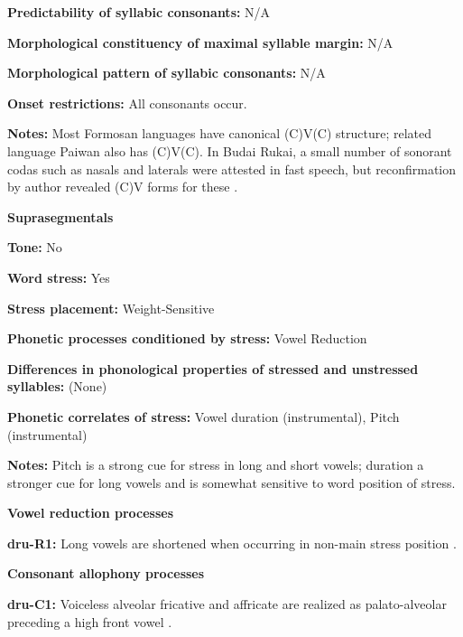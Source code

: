 \textbf{Predictability of syllabic consonants:} N/A



\textbf{Morphological constituency of maximal syllable margin:} N/A



\textbf{Morphological pattern of syllabic consonants:} N/A



\textbf{Onset restrictions:} All consonants occur.



\textbf{Notes:} Most Formosan languages have canonical (C)V(C) structure; related language Paiwan also has (C)V(C). In Budai Rukai, a small number of sonorant codas such as nasals and laterals were attested in fast speech, but reconfirmation by author revealed (C)V forms for these \citep[213]{Chen2006}.



\textbf{Suprasegmentals}



\textbf{Tone:} No



\textbf{Word stress:} Yes



\textbf{Stress placement:} Weight-Sensitive



\textbf{Phonetic processes conditioned by stress:} Vowel Reduction



\textbf{Differences in phonological properties of stressed and unstressed syllables:} (None)



\textbf{Phonetic correlates of stress:} Vowel duration (instrumental), Pitch (instrumental)



\textbf{Notes:} Pitch is a strong cue for stress in long and short vowels; duration a stronger cue for long vowels and is somewhat sensitive to word position of stress.



\textbf{Vowel reduction processes}



\textbf{dru-R1:} Long vowels are shortened when occurring in non-main stress position \citep[257]{Chen2006}.



\textbf{Consonant allophony processes}



\textbf{dru-C1:} Voiceless alveolar fricative and affricate are realized as palato-alveolar preceding a high front vowel \citep[230]{Chen2006}.



